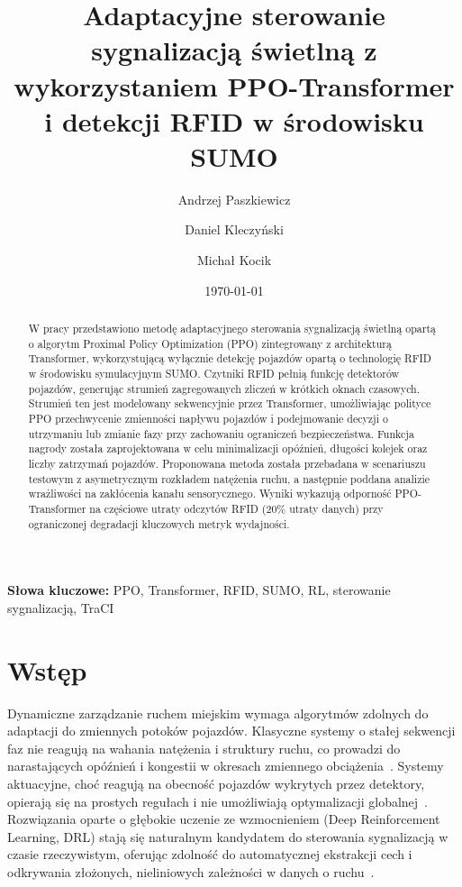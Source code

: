 \documentclass[10pt,a4paper]{article}
\title{Adaptacyjne sterowanie sygnalizacją świetlną z wykorzystaniem PPO-Transformer i detekcji RFID w środowisku SUMO}
\author{Andrzej Paszkiewicz \and Daniel Kleczyński \and Michał Kocik}
\date{\today}
\begin{document}

\maketitle

\begin{abstract}
W pracy przedstawiono metodę adaptacyjnego sterowania sygnalizacją świetlną opartą o algorytm Proximal Policy Optimization (PPO) zintegrowany z architekturą Transformer, wykorzystującą wyłącznie detekcję pojazdów opartą o technologię RFID w środowisku symulacyjnym SUMO. Czytniki RFID pełnią funkcję detektorów pojazdów, generując strumień zagregowanych zliczeń w krótkich oknach czasowych. Strumień ten jest modelowany sekwencyjnie przez Transformer, umożliwiając polityce PPO przechwycenie zmienności napływu pojazdów i podejmowanie decyzji o utrzymaniu lub zmianie fazy przy zachowaniu ograniczeń bezpieczeństwa. Funkcja nagrody została zaprojektowana w celu minimalizacji opóźnień, długości kolejek oraz liczby zatrzymań pojazdów. Proponowana metoda została przebadana w scenariuszu testowym z asymetrycznym rozkładem natężenia ruchu, a następnie poddana analizie wrażliwości na zakłócenia kanału sensorycznego. Wyniki wykazują odporność PPO-Transformer na częściowe utraty odczytów RFID (20\% utraty danych) przy ograniczonej degradacji kluczowych metryk wydajności.
\end{abstract}

\textbf{Słowa kluczowe:} PPO, Transformer, RFID, SUMO, RL, sterowanie sygnalizacją, TraCI

\section{Wstęp}

Dynamiczne zarządzanie ruchem miejskim wymaga algorytmów zdolnych do adaptacji do zmiennych potoków pojazdów. Klasyczne systemy o stałej sekwencji faz nie reagują na wahania natężenia i struktury ruchu, co prowadzi do narastających opóźnień i kongestii w okresach zmiennego obciążenia~\cite{ref1}. Systemy aktuacyjne, choć reagują na obecność pojazdów wykrytych przez detektory, opierają się na prostych regułach i nie umożliwiają optymalizacji globalnej~\cite{ref9}. Rozwiązania oparte o głębokie uczenie ze wzmocnieniem (Deep Reinforcement Learning, DRL) stają się naturalnym kandydatem do sterowania sygnalizacją w czasie rzeczywistym, oferując zdolność do automatycznej ekstrakcji cech i odkrywania złożonych, nieliniowych zależności w danych o ruchu~\cite{ref1,ref2}.
\end{document}
